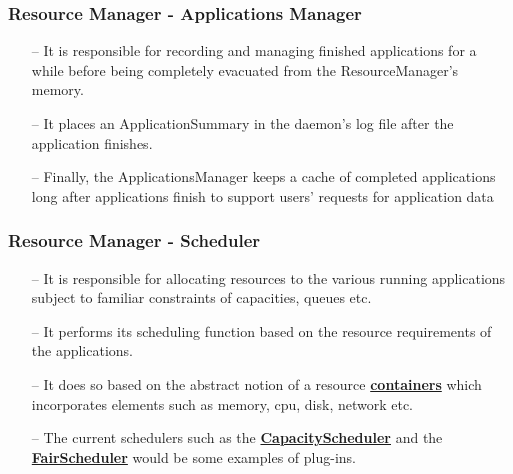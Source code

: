 \begin{frame}[c]{ }
	\frametitle{Resource Manager - Applications Manager}
	
	{\footnotesize
		\begin{itemize}  [<+->]
			\item [--] It is responsible for recording and managing finished applications for a while before being completely evacuated from the ResourceManager’s memory.
			\item [--] It places an ApplicationSummary in the daemon’s log file after the application finishes.
			\item [--] Finally, the ApplicationsManager keeps a cache of completed applications long after applications finish to support users’ requests for application data
		\end{itemize}
	}
	
\end{frame}
\begin{frame}[c]{ }
	\frametitle{Resource Manager -  Scheduler}	
	{\footnotesize
		\begin{itemize}  [<+->]
			\item [--] It is responsible for allocating resources to the various running applications subject to familiar constraints of capacities, queues etc.
			\item [--] It performs its scheduling function based on the resource requirements of the applications.
			\item [--] It does so based on the abstract notion of a resource \textcolor{offyellow}{ \underline{ \textbf{containers}}} which incorporates elements such as memory, cpu, disk, network etc.
			\item [--] The current schedulers such as the \textcolor{offyellow}{ \underline{ \textbf{CapacityScheduler}}} and the \textcolor{offyellow}{ \underline{ \textbf{FairScheduler}}} would be some examples of plug-ins.
		\end{itemize}
	}
\end{frame}


